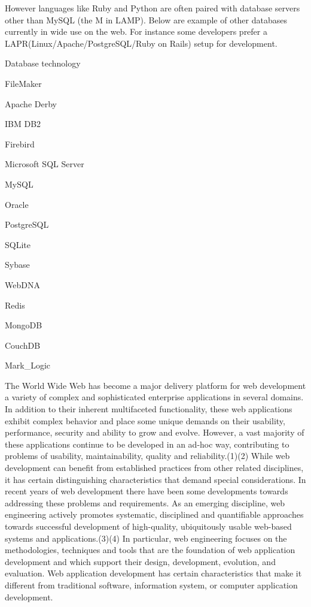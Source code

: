 \begin{compactitem}
However languages like Ruby and Python are often paired with database servers other than MySQL (the M in LAMP). Below are example of other databases currently in wide use on the web. For instance some developers prefer a LAPR(Linux/Apache/PostgreSQL/Ruby on Rails) setup for development.

\item Database technology

\begin{compactitem}
\item FileMaker
\item Apache Derby
\item IBM DB2
\item Firebird
\item Microsoft SQL Server
\item MySQL
\item Oracle
\item PostgreSQL
\item SQLite
\item Sybase
\item WebDNA
\item Redis
\item MongoDB
\item CouchDB
\item Mark\_Logic
\end{compactitem}


\end{compactitem}

The World Wide Web has become a major delivery platform for web development a variety of complex and sophisticated enterprise applications in several domains. In addition to their inherent multifaceted functionality, these web applications exhibit complex behavior and place some unique demands on their usability, performance, security and ability to grow and evolve. However, a vast majority of these applications continue to be developed in an ad-hoc way, contributing to problems of usability, maintainability, quality and reliability.(1)(2) While web development can benefit from established practices from other related disciplines, it has certain distinguishing characteristics that demand special considerations. In recent years of web development there have been some developments towards addressing these problems and requirements. As an emerging discipline, web engineering actively promotes systematic, disciplined and quantifiable approaches towards successful development of high-quality, ubiquitously usable web-based systems and applications.(3)(4) In particular, web engineering focuses on the methodologies, techniques and tools that are the foundation of web application development and which support their design, development, evolution, and evaluation. Web application development has certain characteristics that make it different from traditional software, information system, or computer application development.

